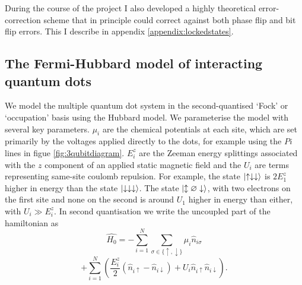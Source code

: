 \documentclass{report}
\begin{document}
During the course of the project I also developed a highly theoretical error-correction scheme that in principle could correct against both phase flip and bit flip errors. This I describe in appendix \ref{appendix:lockedstates}.

\begin{appendices}
\chapter{The Fermi-Hubbard model of interacting quantum dots}\label{appendix:hubbard}

We model the multiple quantum dot system in the second-quantised `Fock' or `occupation' basis using the Hubbard model\cite{Hubbard1963}. 
We parameterise the model with several key parameters. $\mu_i$ are the chemical potentials at each site, which are set primarily by the voltages applied directly to the dots, for example using the $Pi$ lines in figue \ref{fig:3qubitdiagram}. $E^z_i$ are the Zeeman energy splittings associated with the $z$ component of an applied static magnetic field and the $U_i$ are terms representing same-site coulomb repulsion. For example, the state $\ket{\uparrow\downarrow\downarrow}$ is $2E_1^z$ higher in energy than the state $\ket{\downarrow\downarrow\downarrow}$. The state $\ket{\updownarrow\varnothing\downarrow}$, with two electrons on the first site and none on the second is around $U_1$ higher in energy than either, with $U_i \gg E_i^z$. In second quantisation we write the uncoupled part of the hamiltonian as
\begin{equation*}
    \hat{H_0} = -\sum_{i = 1}^{N}{\sum_{\sigma \in \{\uparrow, \downarrow\}}{\mu_i\hat{n}_{i\sigma}}}
\end{equation*}
\begin{equation*}
    +\sum_{i = 1}^{N}{(\frac{E_i^z}{2} (\hat{n}_{i\uparrow} - \hat{n}_{i\downarrow}) 
    + U_i \hat{n}_{i\uparrow} \hat{n}_{i\downarrow}) }.
\end{equation*}


\end{appendices}
\end{document}
